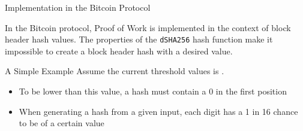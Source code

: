 \documentclass[]{beamer}
\begin{document}
\begin{frame}{Implementation in the Bitcoin Protocol}

In the Bitcoin protocol, Proof of Work is implemented in the context of \color{focus}block header hash values\color{black}. The properties of the \texttt{dSHA256} hash function make it impossible to create a block header hash with a desired value.


 	
\end{frame}

\begin{frame}{A Simple Example}
	Assume the current threshold values is
	.
	
	\begin{itemize}
		\item To be lower than this value, a hash must contain a 0 in the first position
		\item When generating a hash from a given input, each digit has a 1 in 16 chance to be of a certain value
	\end{itemize}

	
\end{frame}
\end{document}
